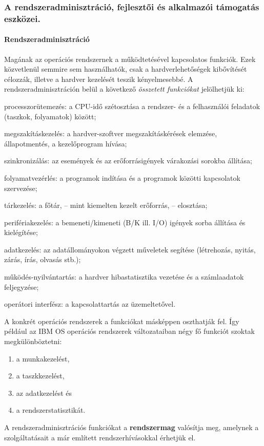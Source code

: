 \subsubsection{A rendszeradminisztráció, fejlesztői és alkalmazói támogatás eszközei.}
\paragraph{Rendszeradminisztráció} 
Magának az operációs rendszernek a működtetésével kapcsolatos funkciók. Ezek közvetlenül semmire sem használhatók, csak a hardverlehetőségek kibővítését célozzák, illetve a hardver kezelését teszik kényelmesebbé. A rendszeradminisztráción belül a következő \emph{összetett funkciókat} jelölhetjük ki:
\begin{enumdescript}
	\item[processzorütemezés:] a CPU-idő szétosztása a rendszer- és a felhasználói feladatok
	(taszkok, folyamatok) között;
	\item[megszakításkezelés:] a hardver-szoftver megszakításkérések elemzése, állapotmentés,
	a kezelőprogram hívása;
	\item[szinkronizálás:] az események és az erőforrásigények várakozási sorokba állítása;
	\item[folyamatvezérlés:] a programok indítása és a programok közötti kapcsolatok
	szervezése;
	\item[tárkezelés:] a főtár, -- mint kiemelten kezelt erőforrás, -- elosztása;
	\item[perifériakezelés:] a bemeneti/kimeneti (B/K ill. I/O) igények sorba állítása és
	kielégítése;
	\item[adatkezelés:] az adatállományokon végzett műveletek segítése (létrehozás, nyitás,
	zárás, írás, olvasás stb.);
	\item[működés-nyilvántartás:] a hardver hibastatisztika vezetése és a számlaadatok
	feljegyzése;
	\item[operátori interfész:] a kapcsolattartás az üzemeltetővel.
\end{enumdescript}
A konkrét operációs rendszerek a funkciókat másképpen oszthatják fel. Így például az IBM OS operációs rendszerek változataiban négy fő funkciót szoktak megkülönböztetni:
\begin{enumerate}
	\item a munkakezelést,
	\item a taszkkezelést,
	\item az adatkezelést és
	\item a rendszerstatisztikát.
\end{enumerate}
A rendszeradminisztrációs funkciókat a \textbf{rendszermag} valósítja meg, amelynek a szolgáltatásait a már említett rendszerhívásokkal érhetjük el.

